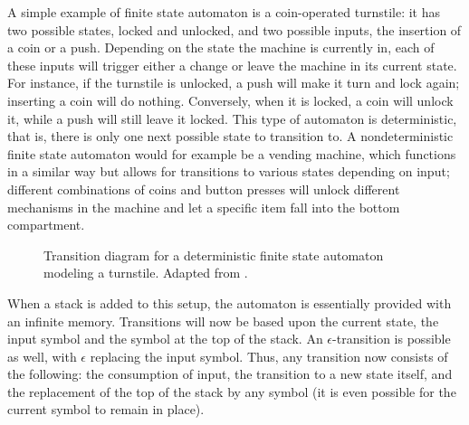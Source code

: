 A simple example of finite state automaton is a coin-operated turnstile: it has
two possible states, locked and unlocked, and two possible inputs, the
insertion of a coin or a push. Depending on the state the machine is currently
in, each of these inputs will trigger either a change or leave the machine in
its current state. For instance, if the turnstile is unlocked, a push will make
it turn and lock again; inserting a coin will do nothing.  Conversely, when it
is locked, a coin will unlock it, while a push will still leave it locked. This
type of automaton is deterministic, that is, there is only one next possible
state to transition to. A nondeterministic finite state automaton would for
example be a vending machine, which functions in a similar way but allows for
transitions to various states depending on input; different combinations of
coins and button presses will unlock different mechanisms in the machine and
let a specific item fall into the bottom compartment.

\begin{figure}
\caption{Transition diagram for a deterministic finite state automaton modeling a turnstile. Adapted from \citet[762]{koshy2004}.} \label{fig:turnstile}
\end{figure}

When a stack is added to this setup, the automaton is essentially provided with
an infinite memory. Transitions will now be based upon the current state, the
input symbol and the symbol at the top of the stack. An $\epsilon$-transition
is possible as well, with $\epsilon$ replacing the input symbol. Thus, any
transition now consists of the following: the consumption of input, the
transition to a new state itself, and the replacement of the top of the stack
by any symbol (it is even possible for the current symbol to remain in place).

